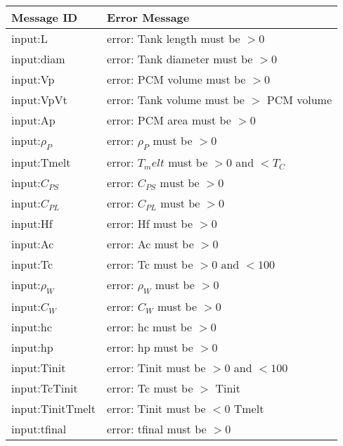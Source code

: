 \documentclass[12pt]{article}
\begin{document}
\begin{table}[!h]
\caption{Possible Exceptions} \label{TblInputVar}
\renewcommand{\arraystretch}{1.2}
\noindent \begin{longtable*}{l l} 
  \toprule
  \textbf{Message ID} & \textbf{Error Message}\\
  \midrule
	input:L &error: Tank length must be $> 0$ \\ 
	input:diam &error: Tank diameter must be $> 0$ \\ 
	input:Vp &error: PCM volume must be $> 0$ \\ 
	input:VpVt &error: Tank volume must be $>$ PCM volume \\ 
	input:Ap &error: PCM area must be $> 0$ \\
	input:$\rho_P$ &error: $\rho_P$ must be $> 0$ \\ 
	input:Tmelt &error: $T_melt$ must be $> 0$ and $< T_C$ \\ 
	input:$C_{PS}$ &error: $C_{PS} \text{ must be } > 0$ \\ 
	input:$C_{PL}$ &error: $C_{PL} \text{ must be } > 0$ \\ 
	input:Hf &error: Hf must be $> 0$ \\ 
	input:Ac &error: Ac must be $> 0$ \\ 
	input:Tc &error: Tc must be $> 0 \text{ and } < 100$ \\ 
	input:$\rho_W$ &error: $\rho_W$ must be $> 0$ \\ 
	input:$C_W$ &error: $C_W$ must be $> 0$ \\ 
	input:hc &error: hc must be $> 0$ \\ 
	input:hp &error: hp must be $> 0$ \\ 
	input:Tinit &error: Tinit must be $> 0$ and $< 100$ \\ 
	input:TcTinit &error: Tc must be $>$ Tinit \\ 
	input:TinitTmelt &error: Tinit must be $< 0$ Tmelt \\ 
	input:tfinal &error: tfinal must be $> 0$ \\ 
  \bottomrule
\end{longtable*}
\end{table}
\end{document}
